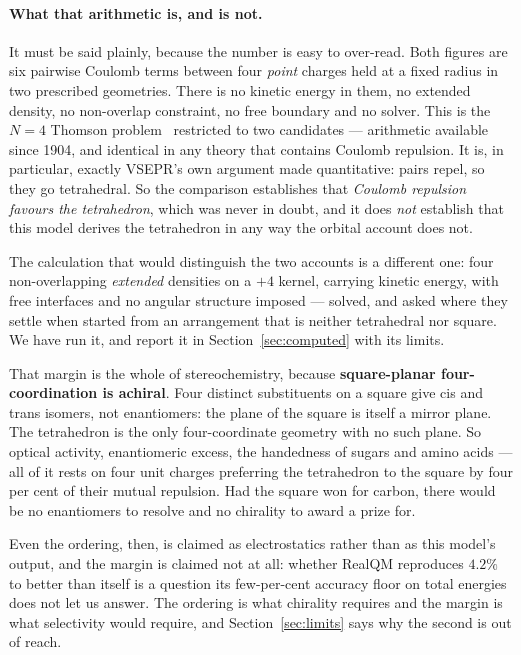 \documentclass[11pt]{article}
\begin{document}
\paragraph{What that arithmetic is, and is not.} It must be said plainly, because the number is
easy to over-read. Both figures are six pairwise Coulomb terms between four \emph{point} charges
held at a fixed radius in two prescribed geometries. There is no kinetic energy in them, no
extended density, no non-overlap constraint, no free boundary and no solver. This is the $N=4$
Thomson problem~\cite{Thomson1904} restricted to two candidates --- arithmetic available since
1904, and identical in any theory that contains Coulomb repulsion. It is, in particular, exactly VSEPR's own argument made
quantitative: pairs repel, so they go tetrahedral. So the comparison establishes that \emph{Coulomb
repulsion favours the tetrahedron}, which was never in doubt, and it does \emph{not} establish that
this model derives the tetrahedron in any way the orbital account does not.

The calculation that would distinguish the two accounts is a different one: four non-overlapping
\emph{extended} densities on a $+4$ kernel, carrying kinetic energy, with free interfaces and no
angular structure imposed --- solved, and asked where they settle when started from an arrangement
that is neither tetrahedral nor square. We have run it, and report it in
Section~\ref{sec:computed} with its limits.

That margin is the whole of stereochemistry, because \textbf{square-planar four-coordination is
achiral}. Four distinct substituents on a square give cis and trans isomers, not enantiomers: the
plane of the square is itself a mirror plane. The tetrahedron is the only four-coordinate geometry
with no such plane. So optical activity, enantiomeric excess, the handedness of sugars and amino
acids --- all of it rests on four unit charges preferring the tetrahedron to the square by four per
cent of their mutual repulsion. Had the square won for carbon, there would be no enantiomers to
resolve and no chirality to award a prize for.

Even the ordering, then, is claimed as electrostatics rather than as this model's output, and the
margin is claimed not at all: whether RealQM reproduces $4.2\%$ to better than itself is a question
its few-per-cent accuracy floor on total energies does not let us answer. The ordering is what
chirality requires and the margin is what selectivity would require, and
Section~\ref{sec:limits} says why the second is out of reach.
\end{document}
